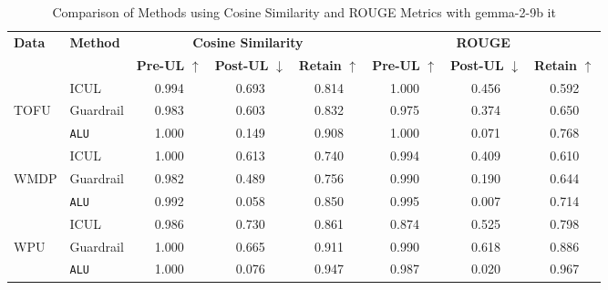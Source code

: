 \begin{table*}[]
    \centering
    \caption{Comparison of Methods using Cosine Similarity and ROUGE Metrics with gemma-2-9b it}
    \begin{tabular}{llccc|ccc}
        \toprule
        \textbf{Data}&\textbf{Method} & \multicolumn{3}{c}{\textbf{Cosine Similarity}} & \multicolumn{3}{c}{\textbf{ROUGE}} \\
        \cmidrule(lr){3-5} \cmidrule(lr){6-8}
         & & \textbf{Pre-UL} $\uparrow$ & \textbf{Post-UL} $\downarrow$ & \textbf{Retain} $\uparrow$ & \textbf{Pre-UL} $\uparrow$ & \textbf{Post-UL} $\downarrow$ & \textbf{Retain} $\uparrow$ \\
        \midrule
        &ICUL & 0.994 & 0.693 & 0.814 & 1.000 & 0.456 & 0.592 \\
        TOFU &Guardrail & 0.983 & 0.603 & 0.832 & 0.975 & 0.374 & 0.650 \\
        &\texttt{ALU}  & 1.000 & 0.149 & 0.908 & 1.000 & 0.071 & 0.768 \\
        \midrule
        &ICUL  & 1.000 & 0.613 & 0.740 & 0.994 & 0.409 & 0.610 \\
        WMDP & Guardrail  & 0.982  & 0.489 & 0.756 & 0.990 & 0.190 & 0.644 \\
        &\texttt{ALU} & 0.992  & 0.058 & 0.850 & 0.995 & 0.007 & 0.714 \\
        \midrule
        &ICUL  & 0.986 & 0.730 & 0.861 & 0.874 & 0.525 & 0.798 \\
        WPU &Guardrail & 1.000 & 0.665 & 0.911 & 0.990 & 0.618 & 0.886 \\
        &\texttt{ALU} & 1.000 & 0.076 & 0.947 & 0.987 & 0.020 & 0.967 \\
        
        \bottomrule
    \end{tabular}
\label{tab:t22}    
\end{table*}


